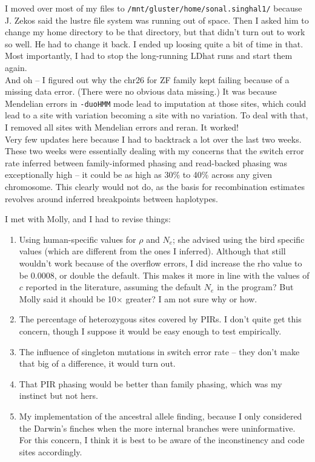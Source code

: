\documentclass[idxtotoc,hyperref,openany,oneside]{labbook} %
\begin{document}
I moved over most of my files to \verb+/mnt/gluster/home/sonal.singhal1/+ because J. Zekos said the lustre file system was running out of space. Then I asked him to change my home directory to be that directory, but that didn't turn out to work so well. He had to change it back. I ended up loosing quite a bit of time in that. Most importantly, I had to stop the long-running LDhat runs and start them again. \\

And oh -- I figured out why the chr26 for ZF family kept failing because of a missing data error. (There were no obvious data missing.) It was because Mendelian errors in \verb+-duoHMM+ mode lead to imputation at those sites, which could lead to a site with variation becoming a site with no variation. To deal with that, I removed all sites with Mendelian errors and reran. It worked! \\

Very few updates here because I had to backtrack a lot over the last two weeks. These two weeks were essentially dealing with my concerns that the switch error rate inferred between family-informed phasing and read-backed phasing was exceptionally high -- it could be as high as 30\% to 40\% across any given chromosome. This clearly would not do, as the basis for recombination estimates revolves around inferred breakpoints between haplotypes. 

I met with Molly, and I had to revise things:
\begin{enumerate}
\item Using human-specific values for $\rho$ and $N_e$; she advised using the bird specific values (which are different from the ones I inferred). Although that still wouldn't work because of the overflow errors, I did increase the rho value to be 0.0008, or double the default. This makes it more in line with the values of $c$ reported in the literature, assuming the default $N_e$ in the program? But Molly said it should be 10$\times$ greater? I am not sure why or how.
\item The percentage of heterozygous sites covered by PIRs. I don't quite get this concern, though I suppose it would be easy enough to test empirically.
\item The influence of singleton mutations in switch error rate -- they don't make that big of a difference, it would turn out.
\item That PIR phasing would be better than family phasing, which was my instinct but not hers.
\item My implementation of the ancestral allele finding, because I only considered the Darwin's finches when the more internal branches were uninformative.  For this concern, I think it is best to be aware of the inconstinency and code sites accordingly. 
\end{enumerate}
\end{document}
